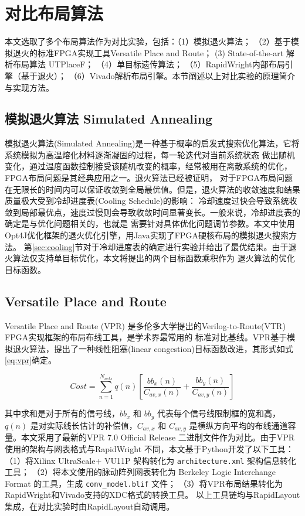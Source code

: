 \section{对比布局算法}
本文选取了多个布局算法作为对比实验，包括：（1）模拟退火算法； （2）基于模拟退火的标准FPGA实现工具Versatile Place and Route；
(3) State-of-the-art 解析布局算法 UTPlaceF； （4）单目标遗传算法； （5）RapidWright内部布局引擎（基于退火）；
（6）Vivado解析布局引擎。本节阐述以上对比实验的原理简介与实现方法。

\subsection{模拟退火算法 Simulated Annealing}
\label{sec:sa}

模拟退火算法(Simulated Annealing)是一种基于概率的启发式搜索优化算法，它将系统模拟为高温熔化材料逐渐凝固的过程，每一轮迭代对当前系统状态
做出随机变化，通过温度函数控制接受该随机改变的概率，经常被用在离散系统的优化，FPGA布局问题是其经典应用之一。退火算法已经被证明，
对于FPGA布局问题在无限长的时间内可以保证收敛到全局最优值。但是，退火算法的收敛速度和结果质量极大受到冷却进度表(Cooling Schedule)的影响：
冷却速度过快会导致系统收敛到局部最优点，速度过慢则会导致收敛时间显著变长。一般来说，冷却进度表的确定是与优化问题相关的，也就是
需要针对具体优化问题调节参数。本文中使用Opt4J优化框架的退火优化引擎，用Java实现了FPGA硬核布局的模拟退火搜索方法。
第\ref{sec:cooling}节对于冷却进度表的确定进行实验并给出了最优结果。由于退火算法仅支持单目标优化，本文将提出的两个目标函数乘积作为
退火算法的优化目标函数。

\subsection{Versatile Place and Route}

Versatile Place and Route (VPR) 是多伦多大学提出的Verilog-to-Route(VTR) FPGA实现框架的布局布线工具，是学术界最常用的
标准对比基线。VPR基于模拟退火算法，提出了一种线性阻塞(linear congestion)目标函数改进，其形式如式\ref{eq:vpr}确定。

\begin{equation}
Cost = \sum_{n=1}^{N_{nets}} q(n) [ \frac{bb_x(n)}{C_{av,x}(n)} + \frac{bb_y(n)}{C_{av,y}(n)} ] 
\label{eq:vpr}
\end{equation}

其中求和是对于所有的信号线，$bb_x$ 和 $bb_y$ 代表每个信号线限制框的宽和高，$q(n)$ 是对实际线长估计的补偿值，$C_{av,x}$ 和 $C_{av,y}$
是横纵方向平均的布线通道容量。本文采用了最新的VPR 7.0 Official Release 二进制文件作为对比。由于VPR使用的架构与网表格式与RapidWright
不同，本文基于Python开发了以下工具：（1）将Xilinx UltraScale+ VU11P 架构转化为 \texttt{architecture.xml} 架构信息转化工具；
（2）将本文使用的脉动阵列网表转化为 Berkeley Logic Interchange Format 的工具，生成 \texttt{conv\_model.blif} 文件；
（3）将VPR布局结果转化为RapidWright和Vivado支持的XDC格式的转换工具。
以上工具链均与RapidLayout集成，在对比实验时由RapidLayout自动调用。

